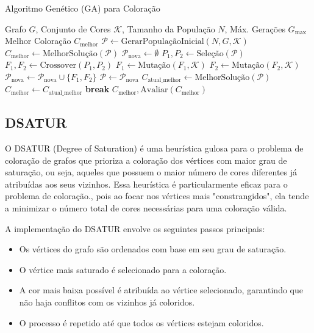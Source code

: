 \documentclass[12pt,a4paper]{article}
\begin{document}
\begin{algorithm}
\caption{Algoritmo Genético (GA) para Coloração}
\label{alg:genetic_algorithm}
\begin{algorithmic}[1]
\REQUIRE Grafo $G$, Conjunto de Cores $\mathcal{K}$, Tamanho da População $N$, Máx. Gerações $G_{\max}$
\ENSURE Melhor Coloração $C_{\text{melhor}}$
\STATE $\mathcal{P} \gets \text{GerarPopulaçãoInicial}(N, G, \mathcal{K})$
\STATE $C_{\text{melhor}} \gets \text{MelhorSolução}(\mathcal{P})$
    \STATE $\mathcal{P}_{\text{nova}} \gets \emptyset$
        \STATE $P_1, P_2 \gets \text{Seleção}(\mathcal{P})$ 
        \STATE $F_1, F_2 \gets \text{Crossover}(P_1, P_2)$ 
        \STATE $F_1 \gets \text{Mutação}(F_1, \mathcal{K})$ 
        \STATE $F_2 \gets \text{Mutação}(F_2, \mathcal{K})$
        \STATE $\mathcal{P}_{\text{nova}} \gets \mathcal{P}_{\text{nova}} \cup \{F_1, F_2\}$
    \ENDFOR
    \STATE $\mathcal{P} \gets \mathcal{P}_{\text{nova}}$ 
    \STATE $C_{\text{atual\_melhor}} \gets \text{MelhorSolução}(\mathcal{P})$
        \STATE $C_{\text{melhor}} \gets C_{\text{atual\_melhor}}$
    \ENDIF
        \STATE \textbf{break}
    \ENDIF
\ENDFOR
\RETURN $C_{\text{melhor}}, \text{Avaliar}(C_{\text{melhor}})$
\end{algorithmic}
\end{algorithm}

\subsection{DSATUR}

O DSATUR (Degree of Saturation) é uma heurística gulosa para o problema de coloração de grafos que prioriza a coloração dos vértices com maior grau de saturação, ou seja, aqueles que possuem o maior número de cores diferentes já atribuídas aos seus vizinhos. Essa heurística é particularmente eficaz para o problema de coloração., pois ao focar nos vértices mais "constrangidos", ela tende a minimizar o número total de cores necessárias para uma coloração válida.

A implementação do DSATUR envolve os seguintes passos principais:

\begin{itemize}
 \item Os vértices do grafo são ordenados com base em seu grau de saturação.
 \item O vértice mais saturado é selecionado para a coloração.
 \item A cor mais baixa possível é atribuída ao vértice selecionado, garantindo que não haja conflitos com os vizinhos já coloridos.
 \item O processo é repetido até que todos os vértices estejam coloridos.
\end{itemize}
\end{document}
